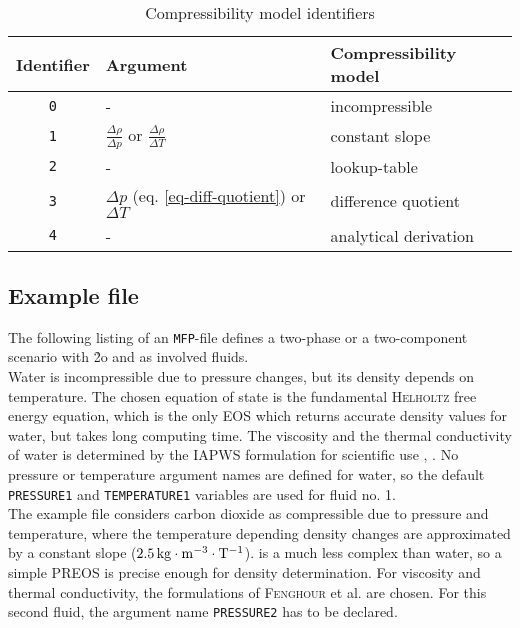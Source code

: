 \begin{table}[ht]
\caption{Compressibility model identifiers}
\begin{center}
\begin{tabular}{cll}
\toprule
Identifier & Argument & Compressibility model \\
\midrule
\texttt{0} & - & incompressible\\
\texttt{1} & $\frac{\Delta \rho}{\Delta p}$ or $\frac{\Delta \rho}{\Delta T}$ & constant slope \\
\texttt{2} & - & lookup-table \\
\texttt{3} & $\Delta p$ (eq. \ref{eq-diff-quotient}) or $\Delta T$ & difference quotient\\
\texttt{4} & - & analytical derivation\\
\bottomrule
\end{tabular}
\end{center}
\label{tab-compressibility-identifiers}
\end{table}

\subsection{Example file}

The following listing of an \texttt{MFP}-file defines a two-phase or a two-component scenario with \h2o and  as involved fluids.\\[1.5ex] 

Water is incompressible due to pressure changes, but its density depends on temperature. The chosen equation of state is the fundamental \textsc{Helholtz} free energy equation, which is the only EOS which returns accurate density values for water, but takes long computing time. The viscosity and the thermal conductivity of water is determined by the IAPWS formulation for scientific use \cite{IAPWS:08a}, \cite{IAPWS:08b}. No pressure or temperature argument names are defined for water, so the default \texttt{PRESSURE1} and \texttt{TEMPERATURE1} variables are used for fluid no. 1.\\[1.5ex] 

The example file considers carbon dioxide as compressible due to pressure and temperature, where the temperature depending density changes are approximated by a constant slope ($\unit[2.5]{kg\cdot m^{-3}\cdot T^{-1}}$).  is a much less complex than water, so a simple PREOS is precise enough for density determination. For viscosity and thermal conductivity, the formulations of \textsc{Fenghour} et al. \cite{FenWakVes:98} are chosen. For this second fluid, the argument name \texttt{PRESSURE2} has to be declared.

